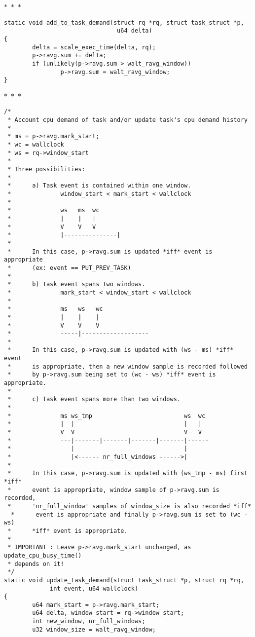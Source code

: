 \documentclass{article}
\newcommand{\divider}{{\begin{center}
  $\ast$~$\ast$~$\ast$
\end{center}}}
\begin{document}
\divider
\begin{verbatim}
static void add_to_task_demand(struct rq *rq, struct task_struct *p,
                                u64 delta)
{
        delta = scale_exec_time(delta, rq);
        p->ravg.sum += delta;
        if (unlikely(p->ravg.sum > walt_ravg_window))
                p->ravg.sum = walt_ravg_window;
}
\end{verbatim}
\divider
\begin{verbatim}
/*
 * Account cpu demand of task and/or update task's cpu demand history
 *
 * ms = p->ravg.mark_start;
 * wc = wallclock
 * ws = rq->window_start
 *
 * Three possibilities:
 *
 *      a) Task event is contained within one window.
 *              window_start < mark_start < wallclock
 *
 *              ws   ms  wc
 *              |    |   |
 *              V    V   V
 *              |---------------|
 *
 *      In this case, p->ravg.sum is updated *iff* event is appropriate
 *      (ex: event == PUT_PREV_TASK)
 *
 *      b) Task event spans two windows.
 *              mark_start < window_start < wallclock
 *
 *              ms   ws   wc
 *              |    |    |
 *              V    V    V
 *              -----|-------------------
 *
 *      In this case, p->ravg.sum is updated with (ws - ms) *iff* event
 *      is appropriate, then a new window sample is recorded followed
 *      by p->ravg.sum being set to (wc - ws) *iff* event is appropriate.
 *
 *      c) Task event spans more than two windows.
 *
 *              ms ws_tmp                          ws  wc
 *              |  |                               |   |
 *              V  V                               V   V
 *              ---|-------|-------|-------|-------|------
 *                 |                               |
 *                 |<------ nr_full_windows ------>|
 *
 *      In this case, p->ravg.sum is updated with (ws_tmp - ms) first *iff*
 *      event is appropriate, window sample of p->ravg.sum is recorded,
 *      'nr_full_window' samples of window_size is also recorded *iff*
  *      event is appropriate and finally p->ravg.sum is set to (wc - ws)
 *      *iff* event is appropriate.
 *
 * IMPORTANT : Leave p->ravg.mark_start unchanged, as update_cpu_busy_time()
 * depends on it!
 */
static void update_task_demand(struct task_struct *p, struct rq *rq,
             int event, u64 wallclock)
{
        u64 mark_start = p->ravg.mark_start;
        u64 delta, window_start = rq->window_start;
        int new_window, nr_full_windows;
        u32 window_size = walt_ravg_window;


\end{verbatim}
\end{document}
